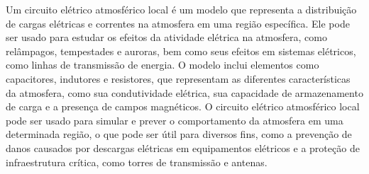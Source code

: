 \documentclass[a4paper, 12pt, onecolumn,singlespacing]{article}
\begin{document}
\begin{itemize}
		Um circuito elétrico atmosférico local é um modelo que representa a distribuição de cargas elétricas e correntes na atmosfera em uma região específica. Ele pode ser usado para estudar os efeitos da atividade elétrica na atmosfera, como relâmpagos, tempestades e auroras, bem como seus efeitos em sistemas elétricos, como linhas de transmissão de energia. O modelo inclui elementos como capacitores, indutores e resistores, que representam as diferentes características da atmosfera, como sua condutividade elétrica, sua capacidade de armazenamento de carga e a presença de campos magnéticos. O circuito elétrico atmosférico local pode ser usado para simular e prever o comportamento da atmosfera em uma determinada região, o que pode ser útil para diversos fins, como a prevenção de danos causados por descargas elétricas em equipamentos elétricos e a proteção de infraestrutura crítica, como torres de transmissão e antenas.
	
	\end{itemize}
	
\end{document}
